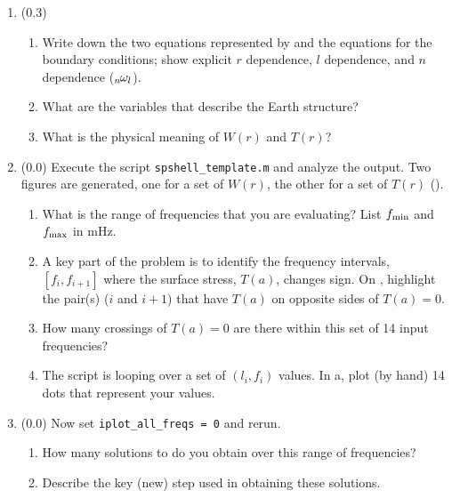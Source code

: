 \documentclass[11pt,titlepage,fleqn]{article}
\newcommand{\omnl}{\mbox{${}_{n\hspace{-0.2 mm}}\omega_l$}}  %
\begin{document}
\begin{enumerate}
\item (0.3)
%
\begin{enumerate}
\item Write down the two equations represented by  and the equations for the boundary conditions; show explicit $r$ dependence, $l$ dependence, and $n$ dependence (\eg $\omnl$).
\item What are the variables that describe the Earth structure?

\item What is the physical meaning of $W(r)$ and $T(r)$?
\end{enumerate}


\item (0.0) Execute the script \verb+spshell_template.m+ and analyze the output. Two figures are generated, one for a set of $W(r)$, the other for a set of $T(r)$ ().
%
\begin{enumerate}
\item What is the range of frequencies that you are evaluating? List $f_{\rm min}$ and $f_{\rm max}$ in mHz.

\item A key part of the problem is to identify the frequency intervals, $[f_i, f_{i+1}]$ where the surface stress, $T(a)$, changes sign. On , highlight the pair(s) ($i$ and $i+1$) that have $T(a)$ on opposite sides of $T(a) = 0$.

\item How many crossings of $T(a) = 0$ are there within this set of 14 input frequencies?

\item The script is looping over a set of $(l_i, f_i)$ values. In a, plot (by hand) 14 dots that represent your values.

\end{enumerate}

\label{prob:Tr}


\item (0.0) Now set \verb+iplot_all_freqs = 0+ and rerun.
%
\begin{enumerate}
\item How many solutions to  do you obtain over this range of frequencies?

\item Describe the key (new) step used in obtaining these solutions.


\end{enumerate}
\end{enumerate}
\end{document}
